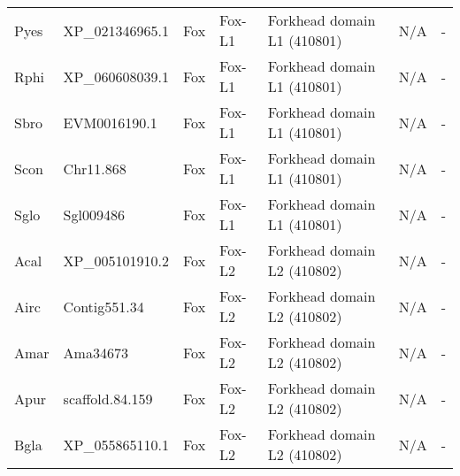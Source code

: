 \documentclass[../main.tex]{subfiles}
\begin{document}
\begin{landscape}
\begin{longtable}{lllllll}
		Pyes           & XP\_021346965.1       & Fox            & Fox-L1              & Forkhead domain L1 (410801)                 & N/A                                                                    & -                    \\
		Rphi           & XP\_060608039.1       & Fox            & Fox-L1              & Forkhead domain L1 (410801)                 & N/A                                                                    & -                    \\
		Sbro           & EVM0016190.1          & Fox            & Fox-L1              & Forkhead domain L1 (410801)                 & N/A                                                                    & -                    \\
		Scon           & Chr11.868             & Fox            & Fox-L1              & Forkhead domain L1 (410801)                 & N/A                                                                    & -                    \\
		Sglo           & Sgl009486             & Fox            & Fox-L1              & Forkhead domain L1 (410801)                 & N/A                                                                    & -                    \\
		Acal           & XP\_005101910.2       & Fox            & Fox-L2              & Forkhead domain L2 (410802)                 & N/A                                                                    & -                    \\
		Airc           & Contig551.34          & Fox            & Fox-L2              & Forkhead domain L2 (410802)                 & N/A                                                                    & -                    \\
		Amar           & Ama34673              & Fox            & Fox-L2              & Forkhead domain L2 (410802)                 & N/A                                                                    & -                    \\
		Apur           & scaffold.84.159       & Fox            & Fox-L2              & Forkhead domain L2 (410802)                 & N/A                                                                    & -                    \\
		Bgla           & XP\_055865110.1       & Fox            & Fox-L2              & Forkhead domain L2 (410802)                 & N/A                                                                    & -                    \\

\end{longtable}
\end{landscape}
\end{document}
